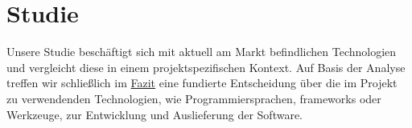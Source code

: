 \chapter{Studie}
Unsere Studie beschäftigt sich mit aktuell am Markt befindlichen Technologien und vergleicht diese in einem projektspezifischen Kontext. Auf Basis der Analyse treffen wir schließlich im \hyperref[sec:fazit]{Fazit} eine fundierte Entscheidung über die im Projekt zu verwendenden Technologien, wie Programmiersprachen, \gls{framework}s oder Werkzeuge, zur Entwicklung und Auslieferung der Software.